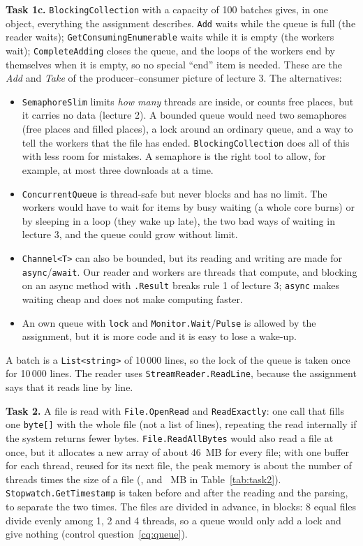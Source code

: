 \documentclass[12pt,a4paper]{article}
\begin{document}
\textbf{Task 1c.} \texttt{BlockingCollection} with a capacity of 100 batches gives, in one object, everything the assignment describes. \texttt{Add} waits while the queue is full (the reader waits); \texttt{GetConsuming\allowbreak Enumerable} waits while it is empty (the workers wait); \texttt{CompleteAdding} closes the queue, and the loops of the workers end by themselves when it is empty, so no special ``end'' item is needed. These are the \textit{Add} and \textit{Take} of the producer--consumer picture of lecture 3. The alternatives:
\begin{itemize}
  \item \texttt{SemaphoreSlim} limits \emph{how many} threads are inside, or counts free places, but it carries no data (lecture 2). A bounded queue would need two semaphores (free places and filled places), a lock around an ordinary queue, and a way to tell the workers that the file has ended. \texttt{BlockingCollection} does all of this with less room for mistakes. A semaphore is the right tool to allow, for example, at most three downloads at a time.
  \item \texttt{ConcurrentQueue} is thread-safe but never blocks and has no limit. The workers would have to wait for items by busy waiting (a whole core burns) or by sleeping in a loop (they wake up late), the two bad ways of waiting in lecture 3, and the queue could grow without limit.
  \item \texttt{Channel<T>} can also be bounded, but its reading and writing are made for \texttt{async}/\texttt{await}. Our reader and workers are threads that compute, and blocking on an async method with \texttt{.Result} breaks rule 1 of lecture 3; \texttt{async} makes waiting cheap and does not make computing faster.
  \item An own queue with \texttt{lock} and \texttt{Monitor.Wait}/\texttt{Pulse} is allowed by the assignment, but it is more code and it is easy to lose a wake-up.
\end{itemize}
A batch is a \texttt{List<string>} of 10\,000 lines, so the lock of the queue is taken once for 10\,000 lines. The reader uses \texttt{StreamReader.ReadLine}, because the assignment says that it reads line by line.

\textbf{Task 2.} A file is read with \texttt{File.OpenRead} and \texttt{ReadExactly}: one call that fills one \texttt{byte[]} with the whole file (not a list of lines), repeating the read internally if the system returns fewer bytes. \texttt{File.ReadAllBytes} would also read a file at once, but it allocates a new array of about 46~MB for every file; with one buffer for each thread, reused for its next file, the peak memory is about the number of threads times the size of a file (\tUsbMemOne{}, \tUsbMemTwo{} and \tUsbMemFour{}~MB in Table~\ref{tab:task2}). \texttt{Stopwatch.GetTimestamp} is taken before and after the reading and the parsing, to separate the two times. The files are divided in advance, in blocks: 8 equal files divide evenly among 1, 2 and 4 threads, so a queue would only add a lock and give nothing (control question~\ref{cq:queue}).
\end{document}
